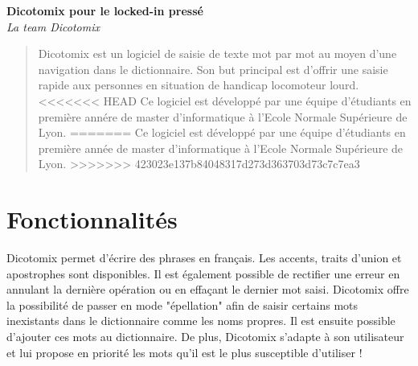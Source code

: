 \documentclass[french]{article}
\begin{document}
	
\begin{titlepage}
	\begin{center}
		\Large\textbf{Dicotomix pour le locked-in pressé}\\
		\large\textit{La team Dicotomix}
	\end{center}
\end{titlepage}

\begin{abstract}
	Dicotomix est un logiciel de saisie de texte mot par mot au moyen d'une navigation dans le dictionnaire. Son but principal est d'offrir une saisie rapide aux personnes en situation de handicap locomoteur lourd.
	\\
<<<<<<< HEAD
	Ce logiciel est développé par une équipe d'étudiants en première annére de master d'informatique à l'Ecole Normale Supérieure de Lyon.
=======
	Ce logiciel est développé par une équipe d'étudiants en première année de master d'informatique à l'Ecole Normale Supérieure de Lyon.
>>>>>>> 423023e137b84048317d273d363703d73c7c7ea3
\end{abstract}

\section*{Fonctionnalités}
Dicotomix permet d'écrire des phrases en français. Les accents, traits d'union et apostrophes sont disponibles. Il est également possible de rectifier une erreur en annulant la dernière opération ou en effaçant le dernier mot saisi. Dicotomix offre la possibilité de passer en mode "épellation" afin de saisir certains mots inexistants dans le dictionnaire comme les noms propres. Il est ensuite possible d'ajouter ces mots au dictionnaire. De plus, Dicotomix s'adapte à son utilisateur et lui propose en priorité les mots qu'il est le plus susceptible d'utiliser !
\end{document}
